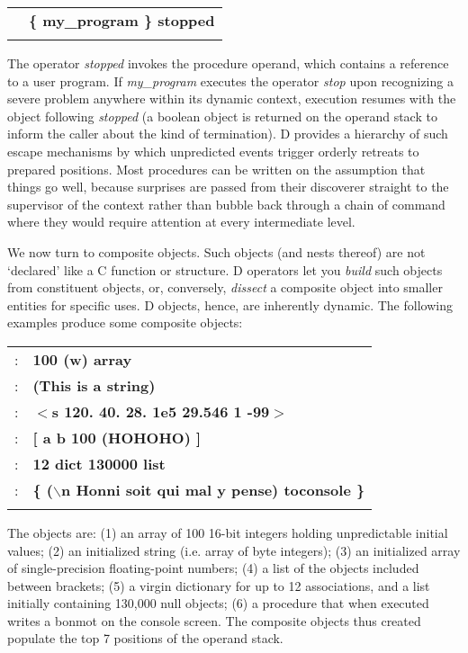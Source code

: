 \begin{tabular}{>{\normalfont}l>{\sffamily\bfseries}l}
 & \{ my\_program \} stopped \\\\
\end{tabular}

\noindent The operator \emph{stopped} invokes the procedure operand,  which  contains  a reference  to a user program.  If \emph{my\_program} executes the operator \emph{stop}  upon  recognizing a severe problem anywhere within its  dynamic  context, execution resumes with the object following \emph{stopped} (a boolean object  is returned  on  the operand stack to inform the caller about  the  kind  of termination).  D provides a hierarchy of such escape mechanisms by  which unpredicted events trigger orderly retreats to prepared  positions.  Most procedures can be written on the assumption that things go well,  because surprises are passed from their discoverer straight to the supervisor  of the  context  rather than bubble back through a chain  of  command where they would require attention at every intermediate level.

We now turn to composite objects.  Such objects (and nests thereof)  are not  `declared' like a C function or structure.  D operators let you \emph{build} such  objects  from  constituent  objects,   or,  conversely,  \emph{dissect}  a composite  object  into smaller entities for specific  uses.  D  objects, hence, are inherently dynamic. The following examples produce some composite objects:\\

\begin{tabular}{>{\normalfont}l>{\sffamily\bfseries}l}
1: & 100 (w) array\\
2: & (This is a string)\\
3: & $<$s 120. 40. 28. 1e5 29.546 1 -99$>$\\
4: & [ a b 100 (HOHOHO) ]\\
5: & 12 dict  130000 list\\
6: & \{ ($\backslash$n Honni soit qui mal y pense) toconsole \}\\\\
\end{tabular}

\noindent The objects are:  (1) an array of 100 16-bit integers holding unpredictable initial values;  (2)  an  initialized string  (i.e.  array  of  byte integers);  (3)  an initialized array of single-precision  floating-point numbers;  (4)  a  list of the objects included between  brackets;  (5)  a virgin  dictionary  for  up to 12  associations,  and  a  list  initially containing 130,000 null objects;  (6) a procedure that when executed writes  a bonmot on the console screen.  The composite objects thus created populate the top 7 positions of the operand stack.

